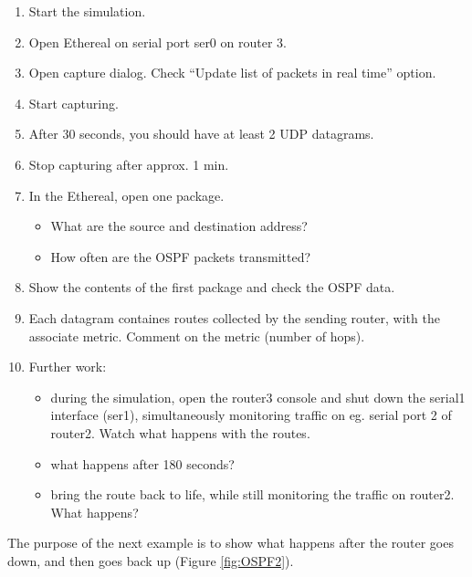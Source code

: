 \begin{enumerate}
 \item	Start the simulation.
 \item	Open Ethereal on serial port ser0 on router 3.
 \item	Open capture dialog. Check ``Update list of packets in real time''
option.
 \item	Start capturing.
 \item	After 30 seconds, you should have at least 2 UDP datagrams.
 \item	Stop capturing after approx. 1 min.
 \item	In the Ethereal, open one package. 
  \begin{itemize}
   \item	What are the source and destination address?
   \item	How often are the OSPF packets transmitted?
  \end{itemize}
 \item	Show the contents of the first package and check the OSPF data.
 \item	Each datagram containes routes collected by the sending router, with
the associate metric. Comment on the metric (number of hops).
 \item	Further work:
   \begin{itemize}
    \item	during the simulation, open the router3 console and shut down
the serial1 interface (ser1), simultaneously monitoring traffic on eg. serial
port 2 of router2. Watch what happens with the routes. 
    \item	what happens after 180 seconds?
    \item	bring the route back to life, while still monitoring the
traffic on router2. What happens?
   \end{itemize}
\end{enumerate}

The purpose of the next example is to show what happens after the router goes
down, and then goes back up (Figure \ref{fig:OSPF2}).



